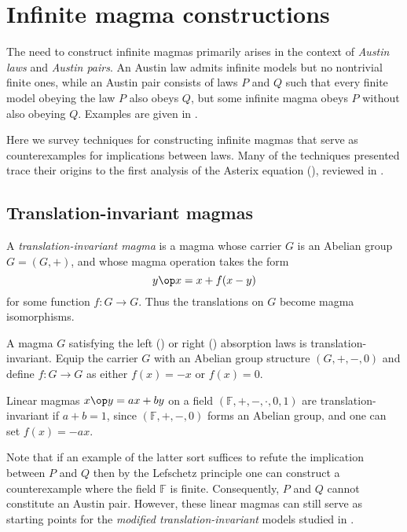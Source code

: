 \chapter{Infinite magma constructions}\label{infinite-magma-constructions-chapter}

The need to construct infinite magmas primarily arises in the context of \emph{Austin laws} and \emph{Austin pairs}.
An Austin law admits infinite models but no nontrivial finite ones, while an Austin pair consists of
laws $P$ and $Q$ such that every finite model obeying the law $P$ also obeys $Q$, but some
infinite magma obeys $P$ without also obeying $Q$. Examples are given in .

Here we survey techniques for constructing infinite magmas that serve as counterexamples for implications
between laws. Many of the techniques presented trace their origins to the first analysis of the Asterix equation
(), reviewed in .

\section{Translation-invariant magmas}

A \emph{translation-invariant magma} is a magma whose carrier $G$ is an Abelian group $G = (G,+)$, and whose magma operation takes the form
$$ y \op x = x + f(x-y)$$
for some function $f: G \to G$.  Thus the translations on $G$ become magma isomorphisms.

\begin{example}
  A magma $G$ satisfying the left () or right () absorption laws is translation-invariant.
  Equip the carrier $G$ with an Abelian group structure $(G,+,-,0)$ and define $f: G \to G$ as either $f(x) = -x$ or $f(x) = 0$.
\end{example}

\begin{example}
  Linear magmas $x\op y = ax+by$ on a field $(\mathbb{F},+,-,\cdot,0,1)$ are translation-invariant if $a + b = 1$,
  since $(\mathbb{F},+,-,0)$ forms an Abelian group, and one can set $f(x) = -ax$.
\end{example}

Note that if an example of the latter sort suffices to refute the implication between $P$ and $Q$ then
by the Lefschetz principle one can construct a counterexample where the field $\mathbb{F}$ is finite.
Consequently, $P$ and $Q$ cannot constitute an Austin pair. However, these linear magmas can still serve
as starting points for the \emph{modified translation-invariant} models studied in .

